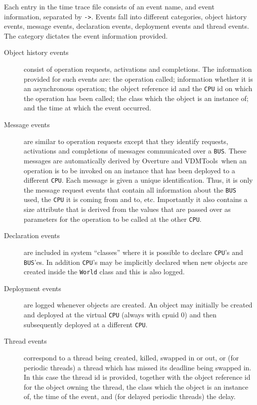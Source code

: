 \documentclass{overturerepchap}
\newcommand{\VDMTools}{VDMTools}
\begin{document}
Each entry in the time trace file consists of an event name, and event
information, separated by \texttt{->}. Events fall into different
categories, object history events, message events, declaration events,
deployment events and thread events. The category
dictates the event information provided.

\begin{description}
\item[Object history events] consist of operation requests, activations and
completions. The information provided for such events are: the
operation called; information whether it is an asynchronous operation;
the object reference id and the \texttt{CPU} id on which the operation has
been called; the class which the object is an instance of; and the
time at which the event occurred.

\item[Message events] are similar to operation requests except that they
    identify requests, activations and completions of messages communicated
    over a \texttt{BUS}. These messages are automatically derived by 
    Overture and 
\VDMTools\ when an operation is to be invoked on an instance that has been
    deployed to a different \texttt{CPU}. Each message is given a unique
    identification. Thus, it is only the message request events that contain
    all information about the \texttt{BUS} used, the \texttt{CPU} it is 
    coming from and to, etc. Importantly it also contains a size attribute
    that is derived from the values that are passed over as parameters for
    the operation to be called at the other \texttt{CPU}. 

\item[Declaration events] are included in system ``classes'' where
    it is possible to declare
    \texttt{CPU}'s and \texttt{BUS}'es. In addition \texttt{CPU}'s may be
    implicitly declared when new objects are created inside the \texttt{World}
    class and this is also logged.

\item[Deployment events] are logged whenever objects are created. 
     An object may initially be created and deployed at the virtual 
     \texttt{CPU} (always with cpuid 0) and then subsequently deployed
     at a different \texttt{CPU}.

\item[Thread events] correspond to a thread being created, killed,
swapped in or out, or (for
periodic threads) a thread which has missed its deadline being swapped
in. In this case the thread id is provided, together with the object
reference id for the object owning the thread, the class which the
object is an instance of, the time of the event, and (for delayed
periodic threads) the delay.
\end{description}
\end{document}
